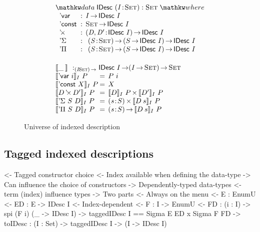 \begin{figure}

\[\stk{
\begin{array}{ll}
\stk{
\data \IDesc{} (\Bhab{\V{I}}{\Set}) : \Set \where \\
\;\;\begin{array}{@{}l@{\::\:\:}l@{\quad}l}
    \DVar{}         & I \To \IDesc{I}                                   \\
    \DConst{}       & \Set \To \IDesc{I}                                \\
    \DProd{}{}      & \PI{\V{D}, \V{D'}}{\IDesc{I}} \IDesc{I}           \\
    \DSigma         & \PI{\V{S}}{\Set} \PIS{S \To \IDesc{I}} \IDesc{I}  \\
    \DPi            & \PI{\V{S}}{\Set} \PIS{S \To \IDesc{I}} \IDesc{I} 
\end{array}
}
\vspace{0.2in}
\\
\stk{
\idescop{\_\:}{}{} :_{\PI{\V{I}}{\Set}} \IDesc{I} \To (\V{I} \To \Set) \To \Set                  \\
\begin{array}{@{}l@{\:=\:\:}ll}
\idescop{\DVar{i}}{I}{P}      &  P~i                                                 \\
\idescop{\DConst{X}}{I}{P}    &  X                                                   \\
\idescop{\DProd{D}{D'}}{I}{P} &  \TIMES{\idescop{D}{I}{P}}{\idescop{D'}{I}{P}}       \\
\idescop{\DSigma{S}{D}}{I}{P} &  \SIGMA{\V{s}}{S} \idescop{D\: s}{I}{P}                    \\
\idescop{\DPi{S}{D}}{I}{P}    &  \PI{\V{s}}{S} \idescop{D\: s}{I}{P}            
\end{array}
}
\end{array}
}\]

\caption{Universe of indexed description}
\label{fig:idesc}

\end{figure}

\subsection{Tagged indexed descriptions}

\begin{wstructure}
<- Tagged constructor choice
    <- Index available when defining the data-type
        -> Can influence the choice of constructors
        -> Dependently-typed data-types
            <- term (index) influence types
    -> Two parts
        <- Always on the menu
            <- E : EnumU 
            <- ED : E -> IDesc I
        <- Index-dependent
            <- F : I -> EnumU 
            <- FD : (i : I) -> spi (F i) (\_ -> IDesc I)
        -> taggedIDesc I == Sigma E ED x Sigma F FD
        -> toIDesc : (I : Set) -> taggedIDesc I -> (I -> IDesc I)
\end{wstructure}


